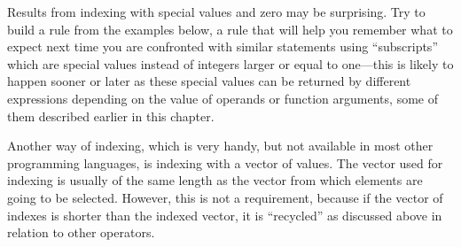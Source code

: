 \documentclass[krantz2]{krantz}\usepackage{knitr}
\begin{document}
\begin{advplayground}
Results from indexing with special values and zero may be surprising. Try to build a rule from the examples below, a rule that will help you remember what to expect next time you are confronted with similar statements using ``subscripts'' which are special values instead of integers larger or equal to one---this is likely to happen sooner or later as these special values can be returned by different \Rlang expressions depending on the value of operands or function arguments, some of them described earlier in this chapter.

\begin{knitrout}\footnotesize
{}\color{fgcolor}\begin{kframe}
\begin{alltt}
\hlstd{a[}\hlstd{]}
\hlstd{a[}\hlstd{(}\hlstd{)]}
\hlstd{a[}\hlstd{]}
\hlstd{a[}\hlstd{(}\hlstd{,} \hlstd{)]}
\hlstd{a[}\hlstd{]}
\hlstd{a[}\hlstd{(}\hlstd{,} \hlstd{)]}
\end{alltt}
\end{kframe}
\end{knitrout}
\end{advplayground}

Another way of indexing, which is very handy, but not available in most other programming languages, is indexing with a vector of  values. The  vector used for indexing is usually of the same length as the vector from which elements are going to be selected. However, this is not a requirement, because if the  vector of indexes is shorter than the indexed vector, it is ``recycled'' as discussed above in relation to other operators.
\end{document}
